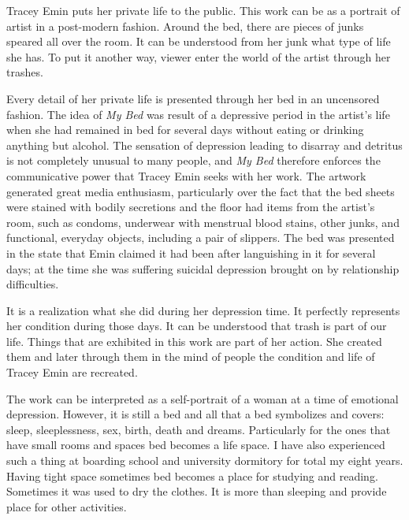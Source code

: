 Tracey Emin puts her private life to the public. This work can be as a portrait of artist in a post-modern fashion. Around the bed, there are pieces of junks speared all over the room. It can be understood from her junk what type of life she has. To put it another way, viewer enter the world of the artist through her trashes.

Every detail of her private life is presented through her bed in an uncensored fashion. The idea of \textit{My Bed} was result of a depressive period in the artist’s life when she had remained in bed for several days without eating or drinking anything but alcohol. The sensation of depression leading to disarray and detritus is not completely unusual to many people, and \textit{My Bed} therefore enforces the communicative power that Tracey Emin seeks with her work. The artwork generated great media enthusiasm, particularly over the fact that the bed sheets were stained with bodily secretions and the floor had items from the artist’s room, such as condoms, underwear with menstrual blood stains, other junks, and functional, everyday objects, including a pair of slippers. The bed was presented in the state that Emin claimed it had been after languishing in it for several days; at the time she was suffering suicidal depression brought on by relationship difficulties.

It is a realization what she did during her depression time. It perfectly represents her condition during those days. It can be understood that trash is part of our life. Things that are exhibited in this work are part of her action. She created them and later through them in the mind of people the condition and life of Tracey Emin are recreated. 

The work can be interpreted as a self-portrait of a woman at a time of emotional depression. However, it is still a bed and all that a bed symbolizes and covers: sleep, sleeplessness, sex, birth, death and dreams. Particularly for the ones that have small rooms and spaces bed becomes a life space. I have also experienced such a thing at boarding school and university dormitory for total my eight years. Having tight space sometimes bed becomes a place for studying and reading. Sometimes it was used to dry the clothes. It is more than sleeping and provide place for other activities.





